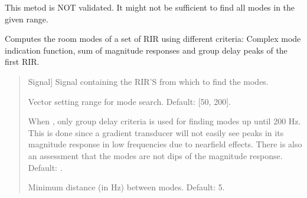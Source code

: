 \documentclass[letterpaper,10pt,english]{sphinxmanual}
\begin{document}

\begin{fulllineitems}
\label{\detokenize{modules/dsptools.room_acoustics:dsptools.room_acoustics.find_modes}}
\pysigstartsignatures
{}
\pysigstopsignatures
\sphinxAtStartPar
This metod is NOT validated. It might not be sufficient to find all
modes in the given range.

\sphinxAtStartPar
Computes the room modes of a set of RIR using different criteria:
Complex mode indication function, sum of magnitude responses and group
delay peaks of the first RIR.
\begin{quote}\begin{description}
\begin{description}
\sphinxlineitem{\sphinxstylestrong{signal}}{[}Signal{]}
\sphinxAtStartPar
Signal containing the RIR’S from which to find the modes.

\sphinxAtStartPar
Vector setting range for mode search. Default: {[}50, 200{]}.

\sphinxAtStartPar
When , only group delay criteria is used for finding modes
up until 200 Hz. This is done since a gradient transducer will not
easily see peaks in its magnitude response in low frequencies
due to near\sphinxhyphen{}field effects.
There is also an assessment that the modes are not dips of
the magnitude response. Default: .

\sphinxAtStartPar
Minimum distance (in Hz) between modes. Default: 5.


\end{description}
\end{description}
\end{quote}
\end{fulllineitems}
\end{document}
